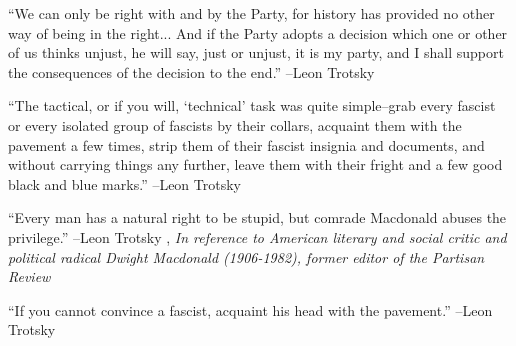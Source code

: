 \documentclass{article}%
\begin{document}
\linebreak%
\vspace{1mm}%
\begin{minipage}{\textwidth}%
\flushleft%
“We can only be right with and by the Party, for history has provided no other way of being in the right... And if the Party adopts a decision which one or other of us thinks unjust, he will say, just or unjust, it is my party, and I shall support the consequences of the decision to the end.”%
\linebreak%
\vspace{1mm}%
–Leon Trotsky%
\linebreak%
\vspace{1mm}%
\end{minipage}%
\linebreak%
\vspace{1mm}%
\begin{minipage}{\textwidth}%
\flushleft%
“The tactical, or if you will, ‘technical’ task was quite simple–grab every fascist or every isolated group of fascists by their collars, acquaint them with the pavement a few times, strip them of their fascist insignia and documents, and without carrying things any further, leave them with their fright and a few good black and blue marks.”%
\linebreak%
\vspace{1mm}%
–Leon Trotsky%
\linebreak%
\vspace{1mm}%
\end{minipage}%
\linebreak%
\vspace{1mm}%
\begin{minipage}{\textwidth}%
\flushleft%
“Every man has a natural right to be stupid, but comrade Macdonald abuses the privilege.”%
\linebreak%
\vspace{1mm}%
–Leon Trotsky%
, \textit{In reference to American literary and social critic and political radical Dwight Macdonald (1906-1982), former editor of the Partisan Review}%
\linebreak%
\vspace{1mm}%
\end{minipage}%
\linebreak%
\vspace{1mm}%
\begin{minipage}{\textwidth}%
\flushleft%
“If you cannot convince a fascist, acquaint his head with the pavement.”%
\linebreak%
\vspace{1mm}%
–Leon Trotsky%
\linebreak%
\vspace{1mm}%
\end{minipage}%
\end{document}
